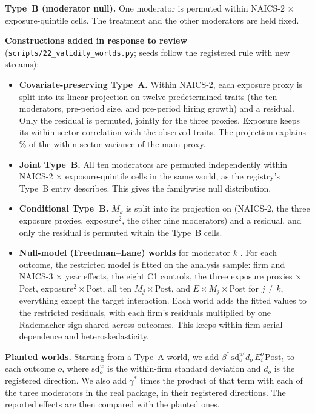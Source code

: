 \documentclass[11pt]{article}
\theoremstyle{remark}\newtheorem{remark}{Remark}
\begin{document}
\textbf{Type~B (moderator null).} One moderator is permuted within NAICS-2 $\times$ exposure-quintile cells. The treatment
and the other moderators are held fixed.

\textbf{Constructions added in response to review} (\texttt{scripts/22\_validity\_worlds.py}; seeds follow the registered
rule with new streams):
\begin{itemize}
\item \textbf{Covariate-preserving Type~A.} Within NAICS-2, each exposure proxy is split into its linear projection on twelve
predetermined traits (the ten moderators, pre-period size, and pre-period hiring growth) and a residual. Only the residual
is permuted, jointly for the three proxies. Exposure keeps its within-sector correlation with the observed traits. The
projection explains \VcovARsq\% of the within-sector variance of the main proxy.
\item \textbf{Joint Type~B.} All ten moderators are permuted independently within NAICS-2 $\times$ exposure-quintile
cells in the same world, as the registry's Type~B entry describes. This gives the familywise null distribution.
\item \textbf{Conditional Type~B.} $M_k$ is split into its projection on (NAICS-2, the three exposure proxies,
exposure$^2$, the other nine moderators) and a residual, and only the residual is permuted within the Type~B cells.
\item \textbf{Null-model (Freedman--Lane) worlds} for moderator $k$ \citep{freedman1983nonstochastic,winkler2014permutation}.
For each outcome, the restricted model is fitted on the analysis sample: firm and NAICS-3 $\times$ year effects, the eight C1
controls, the three exposure proxies $\times$ Post, exposure$^2\times$Post, all ten $M_j\times$Post, and
$E\times M_j\times$Post for $j\neq k$, everything except the target interaction. Each world adds the fitted values to the
restricted residuals, with each firm's residuals multiplied by one Rademacher sign shared across outcomes. This keeps
within-firm serial dependence and heteroskedasticity.
\end{itemize}

\textbf{Planted worlds.} Starting from a Type~A world, we add $\beta^*\,\text{sd}^{w}_o\,d_o\,E^{\sigma}_i\text{Post}_t$
to each outcome $o$, where $\text{sd}^w_o$ is the within-firm standard deviation and $d_o$ is the registered direction. We
also add $\gamma^*$ times the product of that term with each of the three moderators in the real package, in their
registered directions. The reported effects are then compared with the planted ones.
\end{document}
